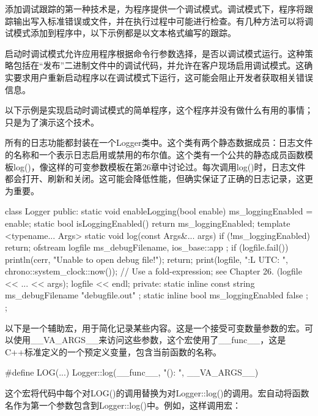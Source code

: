 
添加调试跟踪的第一种技术是，为程序提供一个调试模式。调试模式下，程序将跟踪输出写入标准错误或文件，并在执行过程中可能进行检查。有几种方法可以将调试模式添加到程序中，以下示例都是以文本格式编写的跟踪。


启动时调试模式允许应用程序根据命令行参数选择，是否以调试模式运行。这种策略包括在“发布”二进制文件中的调试代码，并允许在客户现场启用调试模式。这确实要求用户重新启动程序以在调试模式下运行，这可能会阻止开发者获取相关错误信息。

以下示例是实现启动时调试模式的简单程序，这个程序并没有做什么有用的事情；只是为了演示这个技术。

所有的日志功能都封装在一个Logger类中。这个类有两个静态数据成员：日志文件的名称和一个表示日志启用或禁用的布尔值。这个类有一个公共的静态成员函数模板log()，像这样的可变参数模板在第26章中讨论过。每次调用log()时，日志文件都会打开、刷新和关闭。这可能会降低性能，但确实保证了正确的日志记录，这更为重要。

\begin{cpp}
class Logger
{
    public:
        static void enableLogging(bool enable) { ms_loggingEnabled = enable; }
        static bool isLoggingEnabled() { return ms_loggingEnabled; }
        template <typename... Args>
        static void log(const Args&... args)
        {
            if (!ms_loggingEnabled) { return; }
            ofstream logfile { ms_debugFilename, ios_base::app };
            if (logfile.fail()) {
                println(cerr, "Unable to open debug file!");
                return;
            }
            print(logfile, "{:L} UTC: ", chrono::system_clock::now());
            // Use a fold-expression; see Chapter 26.
            (logfile << ... << args);
            logfile << endl;
        }
    private:
        static inline const string ms_debugFilename { "debugfile.out" };
        static inline bool ms_loggingEnabled { false };
};
\end{cpp}

以下是一个辅助宏，用于简化记录某些内容。这是一个接受可变数量参数的宏。可以使用\_\_VA\_ARGS\_\_来访问这些参数，这个宏使用了\_\_func\_\_，这是C++标准定义的一个预定义变量，包含当前函数的名称。

\begin{cpp}
#define LOG(...) Logger::log(__func__, "(): ", __VA_ARGS__)
\end{cpp}

这个宏将代码中每个对LOG()的调用替换为对Logger::log()的调用。宏自动将函数名作为第一个参数包含到Logger::log()中。例如，这样调用宏：

